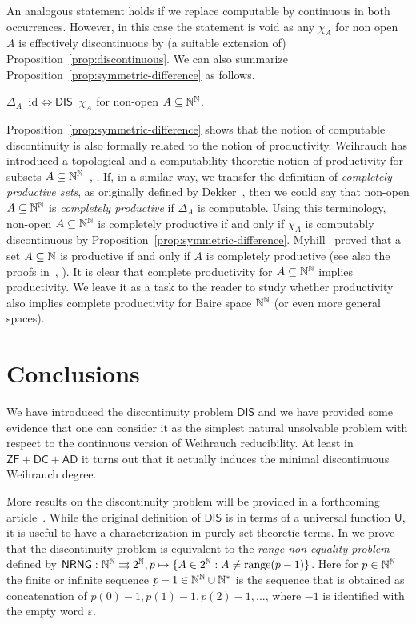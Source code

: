 \documentclass{amsart}
\def\IN{{\Bbb{N}}}
\def\In{\subseteq}
\def\mto{\rightrightarrows}
\def\U{{\mathsf{{U}}}}
\def\leqW{\mathop{\leq_{\mathrm{W}}}}
\def\leqW{\mathop{\leq_{\mathrm{W}}}}
\def\id{{\mathrm{id}}}
\def\range{{\mathrm{range}}}
\def\NRNG{\mathsf{NRNG}}
\def\DIS{\mathsf{DIS}}
\def\AD{\mathsf{AD}}
\def\ZF{\mathsf{ZF}}
\def\DC{\mathsf{DC}}
\begin{document}
An analogous statement holds if we replace computable by continuous in both occurrences. However,
in this case the statement is void as any $\chi_A$ for non open $A$ is effectively discontinuous
by (a suitable extension of) Proposition~\ref{prop:discontinuous}.
We can also summarize Proposition~\ref{prop:symmetric-difference} as follows.

\begin{corollary}
\label{cor:symmetric-difference}
$\Delta_A\leqW\id\iff\DIS\leqW\chi_A$ for non-open $A\In\IN^\IN$.
\end{corollary}

Proposition~\ref{prop:symmetric-difference} 
shows that the notion of computable discontinuity is also formally related to the notion of productivity. 
Weihrauch has introduced a topological and a computability theoretic notion of productivity for subsets $A\In\IN^\IN$~\cite[Definition~4.4]{Wei85},
\cite[Definition~3.2.24]{Wei87}.
If, in a similar way, we transfer the definition of {\em completely productive sets}, as originally defined by Dekker~\cite{Dek55},
then we could say that non-open $A\In \IN^\IN$ is {\em completely productive} if $\Delta_A$ is computable.
Using this terminology, non-open $A\In \IN^\IN$ is completely productive if and only if $\chi_A$ is computably discontinuous by Proposition~\ref{prop:symmetric-difference}.
Myhill~\cite{Myh55} proved that a set $A\In\IN$ is productive if and only if $A$ is completely productive (see also the proofs in~\cite[Theorem~VII, \S 11.3]{Rog67},  \cite[Corollary~2.6.8]{Wei87}).
It is clear that complete productivity for $A\In\IN^\IN$ implies productivity.
We leave it as a task to the reader to study whether productivity also implies complete productivity for Baire space $\IN^\IN$ (or even more general spaces).


\section{Conclusions}
\label{sec:conclusions}

We have introduced the discontinuity problem $\DIS$ and we have provided some evidence that one can consider it
as the simplest natural unsolvable problem with respect to the continuous version of Weihrauch reducibility. 
At least in $\ZF+\DC+\AD$ it turns out that it actually induces the minimal discontinuous Weihrauch degree.

More results on the discontinuity problem will be provided in a forthcoming article~\cite{Bra20b}.
While the original definition of $\DIS$ is in terms of a universal function $\U$,
it is useful to have a characterization in purely set-theoretic terms. 
In \cite{Bra20b} we prove that the discontinuity problem is equivalent to the {\em range non-equality problem}
defined by 
$\NRNG:\IN^\IN\mto2^\IN,p\mapsto\{A\in2^\IN:A\not=\range(p-1)\}$.
Here for $p\in\IN^\IN$ the finite or infinite sequence $p-1\in\IN^\IN\cup\IN^*$ 
is the sequence that is obtained as concatenation of $p(0)-1, p(1)-1, p(2)-1,...$,
where $-1$ is identified with the empty word $\varepsilon$.
\end{document}
